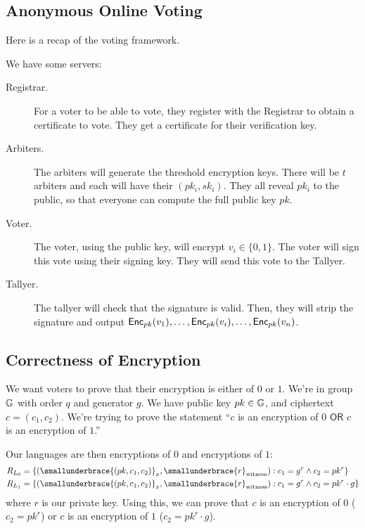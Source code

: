 \subsection{Anonymous Online Voting}

Here is a recap of the voting framework.

We have some servers:
\begin{description}
    \item[Registrar.] For a voter to be able to vote, they register with the Registrar to obtain a certificate to vote. They get a certificate for their verification key.
    \item[Arbiters.] The arbiters will generate the threshold encryption keys. There will be $t$ arbiters and each will have their $(pk_i, sk_i)$. They all reveal $pk_i$ to the public, so that everyone can compute the full public key $pk$.
    \item[Voter.] The voter, using the public key, will encrypt $v_i \in\{0, 1\}$. The voter will sign this vote using their signing key. They will send this vote to the Tallyer.
    \item[Tallyer.] The tallyer will check that the signature is valid. Then, they will strip the signature and output $\operatorname{\mathsf{Enc}}_{pk}(v_1), \dots, \operatorname{\mathsf{Enc}}_{pk}(v_i), \dots, \operatorname{\mathsf{Enc}}_{pk}(v_n)$.
\end{description}

\subsection{Correctness of Encryption}
We want voters to prove that their encryption is either of $0$ or $1$. We're in group $\mathbb G$ with order $q$ and generator $g$. We have public key $pk\in \mathbb G$, and ciphertext $c = (c_1, c_2)$. We're trying to prove the statement ``$c$ is an encryption of $0$ $\mathsf{OR}$ $c$ is an encryption of $1$.''

Our languages are then encryptions of $0$ and encryptions of $1$:
\begin{align*}
    R_{L_0} & = \{(\smallunderbrace{(pk, c_1, c_2)}_{x}, \smallunderbrace{r}_{\text{witness}}) : c_1 = g^r\land c_2 = pk^r\}        \\
    R_{L_1} & = \{(\smallunderbrace{(pk, c_1, c_2)}_{x}, \smallunderbrace{r}_{\text{witness}}) : c_1 = g^r\land c_2 = pk^r\cdot g\}
\end{align*}
where $r$ is our private key. Using this, we can prove that $c$ is an encryption of $0$ ($c_2 = pk^r$) or $c$ is an encryption of $1$ ($c_2 = pk^r\cdot g$).

